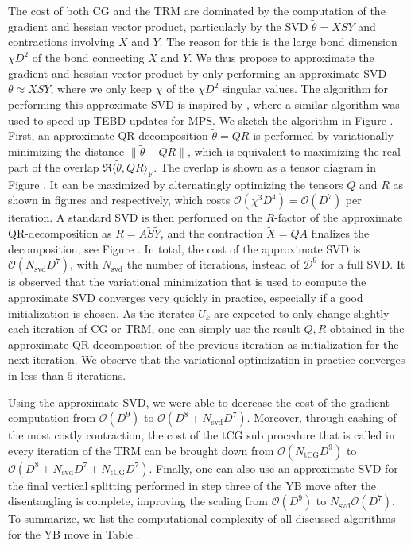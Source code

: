 The cost of both CG and the TRM are dominated by the computation of the gradient and hessian vector product, particularly by the SVD $\tilde{\theta} = XSY$ and contractions involving $X$ and $Y$. The reason for this is the large bond dimension $\chi D^2$ of the bond connecting $X$ and $Y$. We thus propose to approximate the gradient and hessian vector product by only performing an approximate SVD $\tilde{\theta} \approx \tilde{X}\tilde{S}\tilde{Y}$, where we only keep $\chi$ of the $\chi D^2$ singular values. The algorithm for performing this approximate SVD is inspired by \cite{cite:fast_time_evolution_of_mps_using_qr}, where a similar algorithm was used to speed up TEBD updates for MPS. We sketch the algorithm in Figure . First, an approximate QR-decomposition $\tilde{\theta} = QR$ is performed by variationally minimizing the distance $\lVert \tilde{\theta} - QR \rVert$, which is equivalent to maximizing the real part of the overlap $\Re\langle\tilde{\theta},QR\rangle_\text{F}$. The overlap is shown as a tensor diagram in Figure . It can be maximized by alternatingly optimizing the tensors $Q$ and $R$ as shown in figures  and  respectively, which costs $\mathcal{O}(\chi^3D^4) = \mathcal{O}(D^7)$ per iteration. A standard SVD is then performed on the $R$-factor of the approximate QR-decomposition as $R = A\tilde{S}\tilde{Y}$, and the contraction $\tilde{X} = QA$ finalizes the decomposition, see Figure . In total, the cost of the approximate SVD is $\mathcal{O}(N_\text{svd}D^7)$, with $N_\text{svd}$ the number of iterations, instead of $\mathcal{D^9}$ for a full SVD. It is observed that the variational minimization that is used to compute the approximate SVD converges very quickly in practice, especially if a good initialization is chosen. As the iterates $U_k$ are expected to only change slightly each iteration of CG or TRM, one can simply use the result $Q, R$ obtained in the approximate QR-decomposition of the previous iteration as initialization for the next iteration. We observe that the variational optimization in practice converges in less than $5$ iterations. \par
Using the approximate SVD, we were able to decrease the cost of the gradient computation from $\mathcal{O}(D^9)$ to $\mathcal{O}(D^8 + N_\text{svd}D^7)$. Moreover, through cashing of the most costly contraction, the cost of the tCG sub procedure that is called in every iteration of the TRM can be brought down from $\mathcal{O}(N_\text{tCG}D^9)$ to $\mathcal{O}(D^8+N_\text{svd}D^7 + N_\text{tCG} D^7)$. Finally, one can also use an approximate SVD for the final vertical splitting performed in step three of the YB move after the disentangling is complete, improving the scaling from $\mathcal{O}(D^9)$ to $N_\text{svd} \mathcal{O}(D^7)$. To summarize, we list the computational complexity of all discussed algorithms for the YB move in Table .
